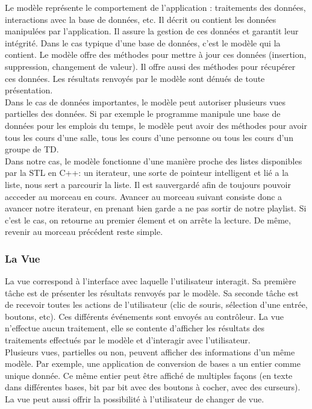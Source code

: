 \documentclass[12pt,a4paper]{report}
\begin{document}
Le modèle représente le comportement de l'application : traitements des données, interactions avec la base de données, etc. Il décrit ou contient les données manipulées par l'application. Il assure la gestion de ces données et garantit leur intégrité. Dans le cas typique d'une base de données, c'est le modèle qui la contient. Le modèle offre des méthodes pour mettre à jour ces données (insertion, suppression, changement de valeur). Il offre aussi des méthodes pour récupérer ces données. Les résultats renvoyés par le modèle sont dénués de toute présentation.\\

Dans le cas de données importantes, le modèle peut autoriser plusieurs vues partielles des données. Si par exemple le programme manipule une base de données pour les emplois du temps, le modèle peut avoir des méthodes pour avoir tous les cours d'une salle, tous les cours d'une personne ou tous les cours d'un groupe de TD.\\

Dans notre cas, le modèle fonctionne d'une manière proche des listes disponibles par la STL en C++: un iterateur, une sorte de pointeur intelligent et lié a la liste, nous sert a parcourir la liste. Il est sauvergardé afin de toujours pouvoir accceder au morceau en cours. Avancer au morceau suivant consiste donc a avancer notre iterateur, en prenant bien garde a ne pas sortir de notre playlist. Si c'est le cas, on retourne au premier élement et on arrête la lecture. De même, revenir au morceau précédent reste simple.\\

\subsubsection{La Vue}

La vue correspond à l'interface avec laquelle l'utilisateur interagit. Sa première tâche est de présenter les résultats renvoyés par le modèle. Sa seconde tâche est de recevoir toutes les actions de l'utilisateur (clic de souris, sélection d'une entrée, boutons, etc). Ces différents événements sont envoyés au contrôleur. La vue n'effectue aucun traitement, elle se contente d'afficher les résultats des traitements effectués par le modèle et d'interagir avec l'utilisateur.\\

Plusieurs vues, partielles ou non, peuvent afficher des informations d'un même modèle. Par exemple, une application de conversion de bases a un entier comme unique donnée. Ce même entier peut être affiché de multiples façons (en texte dans différentes bases, bit par bit avec des boutons à cocher, avec des curseurs). La vue peut aussi offrir la possibilité à l'utilisateur de changer de vue.\\
\end{document}

